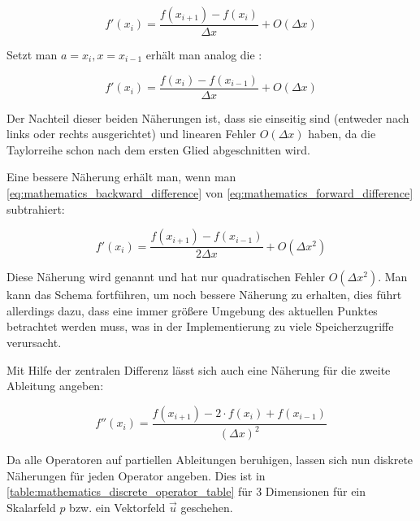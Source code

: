 \begin{equation}
\label{eq:mathematics_forward_difference}
f'(x_i) = \frac{f(x_{i+1}) - f(x_i)}{\Delta x} + O(\Delta x)
\end{equation}

Setzt man $a=x_i,x=x_{i-1}$ erhält man analog die
:

\begin{equation}
\label{eq:mathematics_backward_difference}
f'(x_i) = \frac{f(x_i) - f(x_{i-1})}{\Delta x} + O(\Delta x)
\end{equation}

Der Nachteil dieser beiden Näherungen ist, dass sie einseitig sind (entweder
nach links oder rechts ausgerichtet) und linearen Fehler $O(\Delta x)$ haben, da
die Taylorreihe schon nach dem ersten Glied abgeschnitten wird.

Eine bessere Näherung erhält man, wenn man
\autoref{eq:mathematics_backward_difference} von
\autoref{eq:mathematics_forward_difference} subtrahiert:

\begin{equation}
f'(x_i) = \frac{f(x_{i+1}) - f(x_{i-1})}{2 \Delta x} + O(\Delta x^2)
\end{equation}

Diese Näherung wird  genannt und hat
nur quadratischen Fehler $O(\Delta x^2)$. Man kann das Schema fortführen, um
noch bessere Näherung zu erhalten, dies führt allerdings dazu, dass eine immer
größere Umgebung des aktuellen Punktes betrachtet werden muss, was in der
Implementierung zu viele Speicherzugriffe verursacht.

Mit Hilfe der zentralen Differenz lässt sich auch eine Näherung für die zweite
Ableitung angeben:

\begin{equation}
f''(x_i)
=
\frac
{
	f(
		x_{i+1}) -
	2 \cdot
	f(
		x_i)
	+
	f(
		x_{i-1})
}
{
	(\Delta x)^2
}
\end{equation}

Da alle Operatoren auf partiellen Ableitungen beruhigen, lassen sich nun
diskrete Näherungen für jeden Operator angeben. Dies ist in
\autoref{table:mathematics_discrete_operator_table} für 3 Dimensionen für ein
Skalarfeld $p$ bzw. ein Vektorfeld $\vec{u}$ geschehen.

